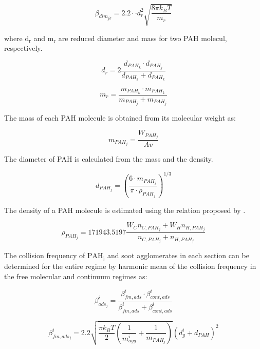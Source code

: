 \begin{equation}
	\beta_{dim_{jk}}=
	2.2 \cdot \cdot d^2_{r} \sqrt{\frac{8 \pi k_B T}{m_{r}}}
	\label{eqn:betadim}
\end{equation}

where $\mathrm{d_{r}}$ and $\mathrm{m_{r}}$ are reduced diameter and mass for two PAH molecul, respectively.

\begin{equation}
	d_{r}=
	2\frac{d_{PAH_k}\cdot d_{PAH_j}}{d_{PAH_k}+d_{PAH_k}}
	\label{eqn:drPAH}
\end{equation}

\begin{equation}
	m_{r}=
		\frac{m_{PAH_k}\cdot m_{PAH_k}}{m_{PAH_j}+ m_{PAH_j}}
	\label{eqn:mrPAH}
\end{equation}

The mass of each PAH molecule is obtained from its molecular weight as:

\begin{equation}
	m_{PAH_j}=
	\frac{W_{PAH_j}}{Av}
	\label{eqn:mPAH}
\end{equation}

The diameter of PAH is calculated from the mass and the density.

\begin{equation}
	d_{PAH_j}=
	\left(
		\frac{6\cdot m_{PAH_j}}{\pi\cdot\rho_{PAH_j}}
	\right)^{1/3}
	\label{eqn:dPAH}
\end{equation}

The density of a PAH molecule is estimated using the relation proposed by \citet{johansson2016formation}.

\begin{equation}
	\rho_{PAH_j}= 
	171943.5197
	\frac{W_{C}n_{C,PAH_j}+W_{H}n_{H,PAH_j}}
	{n_{C,PAH_j}+n_{H,PAH_j}}
	\label{eqn:rhoPAH}
\end{equation}

The collision frequency of $\mathrm{PAH_j}$ and soot agglomerates in each section can be determined for the entire regime by harmonic mean of the collision frequency in the free molecular and continuum regimes as:

\begin{equation}
	\beta^i_{ads_j}=
	\frac{\beta^i_{fm, ads}\cdot \beta^i_{cont, ads}}
	{\beta^i_{fm, ads}+\beta^i_{cont, ads}}
	\label{eqn:betahmads}
\end{equation}

\begin{equation}
	\beta^i_{fm, ads_j}=
	2.2 
	\sqrt{
		\frac{\pi k_B T}{2}\left(\frac{1}{m^i_{agg}}+\frac{1}{m_{PAH_j}}\right)
	}
	\left(d^i_g+d_{PAH}\right)^2
	\label{eqn:betafmads}
\end{equation}

